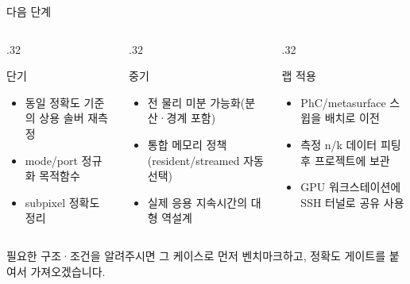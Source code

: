 \documentclass[aspectratio=169,11pt]{beamer}
\begin{document}
\begin{frame}{다음 단계}
  \begin{columns}[T]
    \begin{column}{.32\textwidth}
      \begin{block}{\footnotesize 단기}
        \footnotesize
        \begin{itemize}
          \item 동일 정확도 기준의 상용 솔버 재측정
          \item mode/port 정규화 목적함수
          \item subpixel 정확도 정리
        \end{itemize}
      \end{block}
    \end{column}
    \begin{column}{.32\textwidth}
      \begin{block}{\footnotesize 중기}
        \footnotesize
        \begin{itemize}
          \item 전 물리 미분 가능화(분산·경계 포함)
          \item 통합 메모리 정책 (resident/streamed 자동 선택)
          \item 실제 응용 지속시간의 대형 역설계
        \end{itemize}
      \end{block}
    \end{column}
    \begin{column}{.32\textwidth}
      \begin{block}{\footnotesize 랩 적용}
        \footnotesize
        \begin{itemize}
          \item PhC/metasurface 스윕을 배치로 이전
          \item 측정 n/k 데이터 피팅 후 프로젝트에 보관
          \item GPU 워크스테이션에 SSH 터널로 공유 사용
        \end{itemize}
      \end{block}
    \end{column}
  \end{columns}
  \vspace{3mm}
  \begin{center}
    \small 필요한 구조·조건을 알려주시면 그 케이스로 먼저 벤치마크하고, 정확도 게이트를 붙여서 가져오겠습니다.
  \end{center}
\end{frame}
\end{document}
